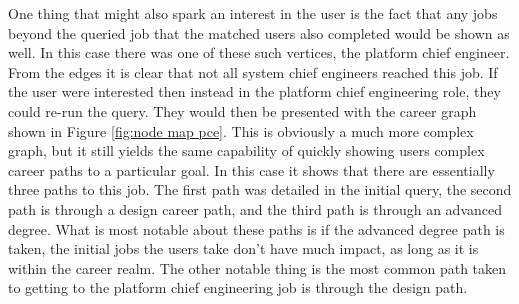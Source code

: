 One thing that might also spark an interest in the user is the fact that any
jobs beyond the queried job that the matched users also completed would be shown
as well.  In this case there was one of these such vertices, the platform chief
engineer.  From the edges it is clear that not all system chief
engineers reached this job.  If the user were interested then instead in the
platform chief engineering role, they could re-run the query.  They would then
be presented with the career graph shown in Figure \ref{fig:node map pce}.  This
is obviously a much more complex graph, but it still yields the same capability
of quickly showing users complex career paths to a particular goal.  In this
case it shows that there are essentially three paths to this job.  The first
path was detailed in the initial query, the second path is through a design
career path, and the third path is through an advanced degree.  What is most
notable about these paths is if the advanced degree path is taken, the initial
jobs the users take don't have much impact, as long as it is within the career realm.
The other notable thing is the most common path taken to getting to the platform
chief engineering job is through the design path.


\usetikzlibrary{shapes,arrows,chains}

